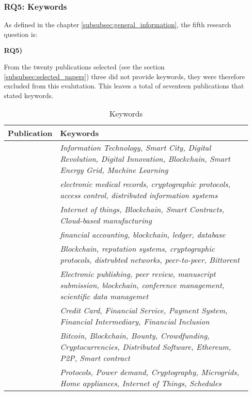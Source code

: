 \subsubsection{RQ5: Keywords}
\label{subsubsec:rq5_keywords}
As defined in the chapter \ref{subsubsec:general_information}, the fifth research question is:
\begin{displayquote}
\textbf{RQ5) }
\end{displayquote}
From the twenty publications selected (see the section \ref{subsubsec:selected_papers}) three \cite{2017_Liu,2018_Lucena,2017_Tackmann} did not provide keywords, they were therefore excluded from this evalutation. This leaves a total of seventeen publications that stated keywords.
\begin{longtable}{ |c|p{9cm}| }
	\caption{Keywords} \\
	\hline
 	\textbf{Publication} & \textbf{Keywords} \\ [0.5ex] 
 	\hline\hline
 	\endhead
 	\citet{2018_Alessandra} & \textit{Information Technology, Smart City, Digital Revolution, Digital Innovation, Blockchain, Smart Energy Grid, Machine Learning}\\ 
	 \hline
	  \citet{2016_Azaria} & \textit{electronic medical records, cryptographic protocols, access control, distributed information systems} \\ 
	 \hline
	 \citet{2016_Bahga} & \textit{Internet of things, Blockchain, Smart Contracts, Cloud-based manufacturing}\\ 
	 \hline
	 \citet{2017_Coyne} & \textit{financial accounting, blockchain, ledger, database}\\ 
	 \hline
	 \citet{2015_Dennis} & \textit{Blockchain, reputation systems, cryptographic protocols, distrubted networks, peer-to-peer, Bittorent} \\ 
	 \hline
	 \citet{2017_Gipp} & \textit{Electronic publishing,
peer review, manuscript   submission, blockchain, conference management, scientific data managemet} \\ 
	 \hline
	 \citet{2017_Jaag} & \textit{Credit Card, Financial Service, Payment System, Financial Intermediary, Financial Inclusion } \\ 
	 \hline
	 \citet{2016_Jacynycz} & \textit{Bitcoin, Blockchain, Bounty, Crowdfunding, Cryptocurrencies, Distributed Software, Ethereum, P2P, Smart contract} \\ 
	 \hline
	 \citet{2016_Kianmajd} & \textit{Protocols, Power demand, Cryptography, Microgrids, Home appliances, Internet of Things, Schedules} \\ 

\end{longtable}
